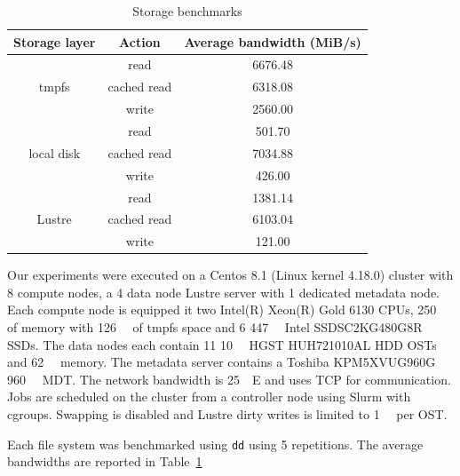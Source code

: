 
      \begin{table}
      \centering
      \begin{tabular}{@{}|c|c|c|@{}}
       \hline
       Storage layer & Action & Average bandwidth (MiB/s) \\
              \hline
       \multirow{3}{*}{tmpfs} & read & 6676.48 \\
       & cached read & 6318.08  \\
       & write & 2560.00 \\
       \hline
       \multirow{3}{*}{local disk} & read & 501.70  \\
       & cached read & 7034.88 \\
       & write & 426.00 \\
       \hline
       \multirow{3}{*}{Lustre} & read & 1381.14 \\
       & cached read & 6103.04  \\
       & write & 121.00  \\

       \hline

      \end{tabular}
      \caption{Storage benchmarks}
      \label{table:sea-comp:fs}
      \end{table}
            Our experiments were executed on a Centos 8.1 (Linux kernel 4.18.0)
      cluster with 8 compute nodes, a 4 data node Lustre server with 1 dedicated
      metadata node. Each compute node is equipped it two Intel(R) Xeon(R) Gold
      6130 CPUs, \SI{250}{\gibi\byte} of memory with \SI{126}{\gibi\byte} of
      tmpfs space and 6 \SI{447}{\gibi\byte} Intel SSDSC2KG480G8R SSDs. The data
      nodes each contain 11 \SI{10}{\tera\byte} HGST HUH721010AL HDD OSTs and
      \SI{62}{\gibi\byte} memory. The metadata server contains a Toshiba
      KPM5XVUG960G \SI{960}{\giga\byte} MDT. The network bandwidth is
      \SI{25}{\giga\bit}E and uses TCP for communication. Jobs are scheduled on
      the cluster from a controller node using Slurm with cgroups. Swapping is
      disabled and Lustre dirty writes is limited to \SI{1}{\giga\byte} per OST.

      Each file system was benchmarked using \texttt{dd} using 5 repetitions.
      The average bandwidths are reported in Table~\ref{table:sea-comp:fs}

